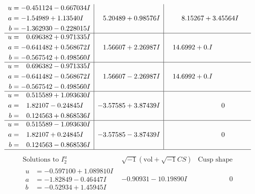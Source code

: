 \documentclass[1p]{elsarticle_modified}
\theoremstyle{definition}
\newcommand{\I}{\sqrt{-1}}
\begin{document}
$$\begin{array}{c|c|c}
\begin{aligned}
u &= -0.451124 - 0.667034 I \\
a &= -1.54989 + 1.13540 I \\
b &= -1.362930 - 0.228015 I\end{aligned}
 & \phantom{-}5.20489 + 0.98576 I & \phantom{-}8.15267 + 3.45564 I \\ \hline\begin{aligned}
u &= \phantom{-}0.696382 + 0.971335 I \\
a &= -0.641482 + 0.568672 I \\
b &= -0.567542 + 0.498560 I\end{aligned}
 & \phantom{-}1.56607 + 2.26987 I & \phantom{-}14.6992 + 0. I\phantom{ +0.000000I} \\ \hline\begin{aligned}
u &= \phantom{-}0.696382 - 0.971335 I \\
a &= -0.641482 - 0.568672 I \\
b &= -0.567542 - 0.498560 I\end{aligned}
 & \phantom{-}1.56607 - 2.26987 I & \phantom{-}14.6992 + 0. I\phantom{ +0.000000I} \\ \hline\begin{aligned}
u &= \phantom{-}0.515589 + 1.093630 I \\
a &= \phantom{-}1.82107 - 0.24845 I \\
b &= \phantom{-}0.124563 + 0.868536 I\end{aligned}
 & -3.57585 + 3.87439 I & \phantom{-0.000000 } 0 \\ \hline\begin{aligned}
u &= \phantom{-}0.515589 - 1.093630 I \\
a &= \phantom{-}1.82107 + 0.24845 I \\
b &= \phantom{-}0.124563 - 0.868536 I\end{aligned}
 & -3.57585 - 3.87439 I & \phantom{-0.000000 } 0\\
 \hline 
 \end{array}$$\newpage$$\begin{array}{c|c|c}  
\text{Solutions to }I^u_{2}& \I (\text{vol} + \sqrt{-1}CS) & \text{Cusp shape}\\
 \hline 
\begin{aligned}
u &= -0.597100 + 1.089810 I \\
a &= -1.82849 - 0.46447 I \\
b &= -0.52934 + 1.45945 I\end{aligned}
 & -0.90931 - 10.19890 I & \phantom{-0.000000 } 0 \\ \hline\begin{aligned}

\end{aligned}
\end{array}$$
\end{document}
